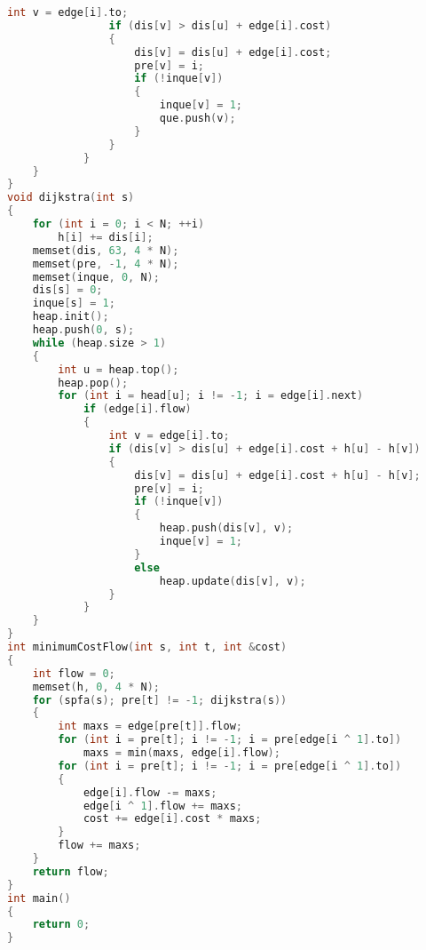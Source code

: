 \begin{lstlisting}[language=c++]
                int v = edge[i].to;
                if (dis[v] > dis[u] + edge[i].cost)
                {
                    dis[v] = dis[u] + edge[i].cost;
                    pre[v] = i;
                    if (!inque[v])
                    {
                        inque[v] = 1;
                        que.push(v);
                    }
                }
            }
    }
}
void dijkstra(int s)
{
    for (int i = 0; i < N; ++i)
        h[i] += dis[i];
    memset(dis, 63, 4 * N);
    memset(pre, -1, 4 * N);
    memset(inque, 0, N);
    dis[s] = 0;
    inque[s] = 1;
    heap.init();
    heap.push(0, s);
    while (heap.size > 1)
    {
        int u = heap.top();
        heap.pop();
        for (int i = head[u]; i != -1; i = edge[i].next)
            if (edge[i].flow)
            {
                int v = edge[i].to;
                if (dis[v] > dis[u] + edge[i].cost + h[u] - h[v])
                {
                    dis[v] = dis[u] + edge[i].cost + h[u] - h[v];
                    pre[v] = i;
                    if (!inque[v])
                    {
                        heap.push(dis[v], v);
                        inque[v] = 1;
                    }
                    else
                        heap.update(dis[v], v);
                }
            }
    }
}
int minimumCostFlow(int s, int t, int &cost)
{
    int flow = 0;
    memset(h, 0, 4 * N);
    for (spfa(s); pre[t] != -1; dijkstra(s))
	{
		int maxs = edge[pre[t]].flow;
		for (int i = pre[t]; i != -1; i = pre[edge[i ^ 1].to])
			maxs = min(maxs, edge[i].flow);	
        for (int i = pre[t]; i != -1; i = pre[edge[i ^ 1].to])
        {
            edge[i].flow -= maxs;
            edge[i ^ 1].flow += maxs;
            cost += edge[i].cost * maxs;
        }
		flow += maxs;
	}
    return flow;
}
int main()
{
	return 0;
}
\end{lstlisting}

